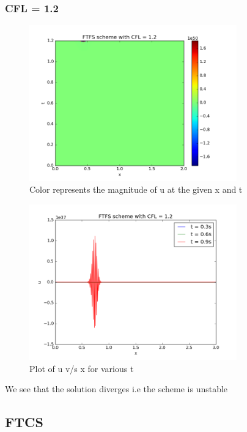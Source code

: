 \documentclass[11pt, a4paper]{article}
\begin{document}
\subsubsection{CFL = 1.2}
\begin{figure}[H]
 \centering
 \includegraphics[width = 0.8\textwidth]{FTFS2_12.png}
 \caption{Color represents the magnitude of u at the given x and t}
\end{figure}

\begin{figure}[H]
 \centering
 \includegraphics[width = 0.8\textwidth]{FTFS2_12_1.png}
 \caption{Plot of u v/s x for various t}
\end{figure}

We see that the solution diverges i.e the scheme is unstable

\subsection{FTCS}
\end{document}
